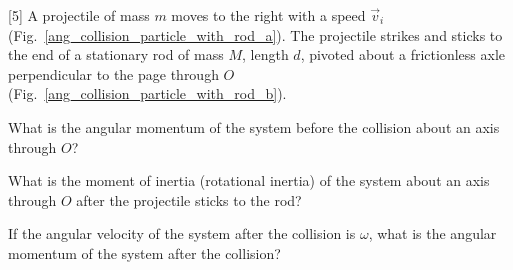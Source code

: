 \begin{problem}\label{prb:ang_collision_particle_with_rod}
	A projectile of mass $m$ moves to the right with a speed $\vec v_i$ (Fig.~\ref{ang_collision_particle_with_rod_a}). The projectile strikes and sticks to the end of a stationary rod of mass $M$, length $d$, pivoted about a frictionless axle perpendicular to the page through $O$ (Fig.~\ref{ang_collision_particle_with_rod_b}).
	\begin{enumerate*}[label=(\alph*)]
		\item What is the angular momentum of the system before the collision about an axis through $O$?
		\item What is the moment of inertia (rotational inertia) of the system about an axis through $O$ after the projectile sticks to the rod?
		\item If the angular velocity of the system after the collision is $\omega$, what is the angular momentum of the system after the collision?

\end{enumerate*}
\end{problem}
